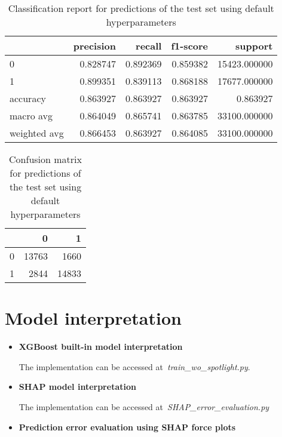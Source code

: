 \documentclass{article}
\begin{document}
{\begin{itemize}
\begin{table}[h!]
\centering
\begin{tabular}{lrrrr}
\toprule
{} &  precision &    recall &  f1-score &       support \\
\midrule
0            &   0.828747 &  0.892369 &  0.859382 &  15423.000000 \\
1            &   0.899351 &  0.839113 &  0.868188 &  17677.000000 \\
accuracy     &   0.863927 &  0.863927 &  0.863927 &      0.863927 \\
macro avg    &   0.864049 &  0.865741 &  0.863785 &  33100.000000 \\
weighted avg &   0.866453 &  0.863927 &  0.864085 &  33100.000000 \\
\bottomrule
\end{tabular}
\caption{Classification report for predictions of the test set using default hyperparameters}
\label{table:model_te_cr}
\end{table}
 
\begin{table}[h!]
\centering
\begin{tabular}{lrr}
\toprule
{} &      0 &      1 \\
\midrule
0 &  13763 &   1660 \\
1 &   2844 &  14833 \\
\bottomrule
\end{tabular}
\caption{Confusion matrix for predictions of the test set using default hyperparameters}
\label{table:model_te_cm}
\end{table}

\end{itemize}

\section{Model interpretation}
\label{sec:interp}

\begin{itemize}
\item \textbf{XGBoost built-in model interpretation}

The implementation can be accessed at~\emph{train\_wo\_spotlight.py}.

\item \textbf{SHAP model interpretation}

The implementation can be accessed at~\emph{SHAP\_error\_evaluation.py}

\item \textbf{Prediction error evaluation using SHAP force plots}


\end{itemize}}
\end{document}
